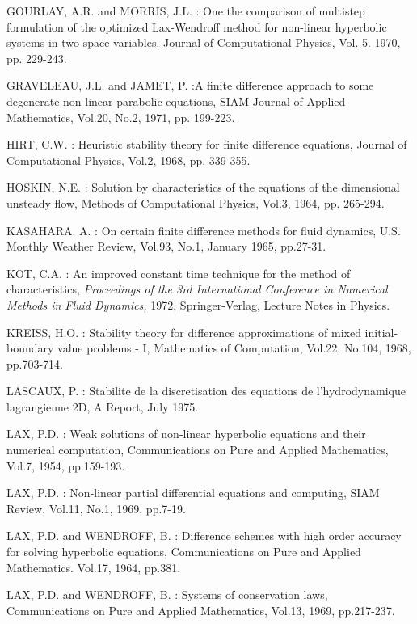 \begin{thebibliography}{99}
 GOURLAY, A.R. and MORRIS, J.L. : One the comparison of
  multistep formulation of the optimized Lax-Wendroff method for
  non-linear hyperbolic systems in two space variables. Journal of
  Computational Physics, Vol. 5. 1970, pp. 229-243.  

 GRAVELEAU, J.L. and JAMET, P. :\pageoriginale  A
  finite difference approach to some degenerate non-linear parabolic
  equations, SIAM Journal of Applied Mathematics, Vol.20, No.2, 1971,
  pp. 199-223.  

 HIRT, C.W. : Heuristic stability theory for finite
  difference equations, Journal of Computational Physics, Vol.2, 1968,
  pp. 339-355.  

 HOSKIN, N.E. : Solution by characteristics of the
  equations of the dimensional unsteady flow, Methods of Computational
  Physics, Vol.3, 1964, pp. 265-294.  

 KASAHARA. A. : On certain finite difference methods
  for fluid dynamics, U.S. Monthly Weather Review, Vol.93, No.1,
  January 1965, pp.27-31.  

 KOT, C.A. : An improved constant time technique for
  the method of characteristics, \textit{Proceedings of the 3rd
    International Conference in Numerical Methods in Fluid Dynamics,}
  1972, Springer-Verlag, Lecture Notes in Physics.  

 KREISS, H.O. : Stability theory for difference
  approximations of mixed initial-boundary value problems - I,
  Mathematics of Computation, Vol.22, No.104, 1968, pp.703-714. 

 LASCAUX, P. : Stabilite de la discretisation des
  equations de l'hydrodynamique lagrangienne 2D, A Report, July 1975.  

 LAX, P.D. : Weak solutions of non-linear hyperbolic
  equations and their numerical computation, Communications on Pure
  and Applied Mathematics, Vol.7, 1954, pp.159-193. 

 LAX, P.D. : Non-linear partial differential equations
  and computing, SIAM Review, Vol.11, No.1, 1969, pp.7-19. 

 LAX, P.D. and WENDROFF, B. : Difference schemes with
  high order accuracy for solving hyperbolic equations, Communications
  on Pure and Applied Mathematics. Vol.17, 1964, pp.381.   

 LAX, P.D. and WENDROFF, B. : Systems of conservation
  laws, Communications on Pure and Applied Mathematics, Vol.13, 1969,
  pp.217-237. 


\end{thebibliography}
